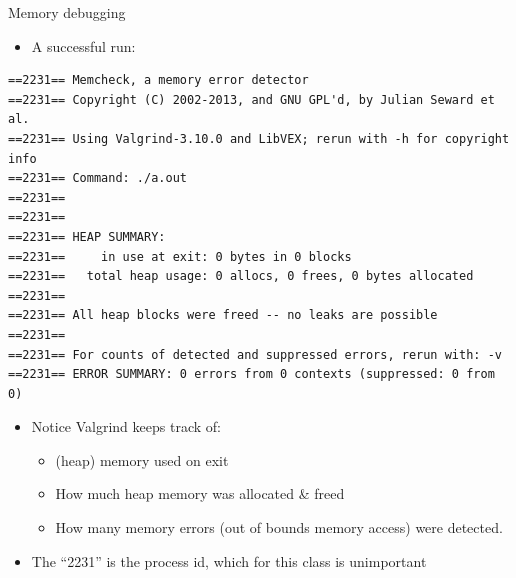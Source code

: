 \documentclass{beamer}
\begin{document}
\begin{frame}[fragile]{Memory debugging}
\begin{itemize}
\item A successful run:
\end{itemize}
\begin{lstlisting}
==2231== Memcheck, a memory error detector
==2231== Copyright (C) 2002-2013, and GNU GPL'd, by Julian Seward et al.
==2231== Using Valgrind-3.10.0 and LibVEX; rerun with -h for copyright info
==2231== Command: ./a.out
==2231== 
==2231== 
==2231== HEAP SUMMARY:
==2231==     in use at exit: 0 bytes in 0 blocks
==2231==   total heap usage: 0 allocs, 0 frees, 0 bytes allocated
==2231== 
==2231== All heap blocks were freed -- no leaks are possible
==2231== 
==2231== For counts of detected and suppressed errors, rerun with: -v
==2231== ERROR SUMMARY: 0 errors from 0 contexts (suppressed: 0 from 0)
\end{lstlisting}
\begin{itemize}
\item Notice Valgrind keeps track of:
\begin{itemize}
\item (heap) memory used on exit
\item How much heap memory was allocated \& freed
\item How many memory errors (out of bounds memory access) were detected.
\end{itemize}
\item The ``2231'' is the process id, which for this class is unimportant
\end{itemize}
\end{frame}
\end{document}
